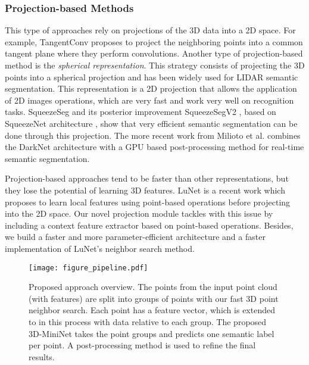 \documentclass[letterpaper, 10 pt, journal, twoside]{IEEEtran}
\begin{document}
\subsubsection{Projection-based Methods}
This type of approaches rely on projections of the 3D data into a 2D space.
For example, TangentConv\cite{tangentconv} proposes to project the neighboring points into a common tangent plane where they perform convolutions.
Another type of projection-based method is the \textit{spherical representation}. This strategy consists of projecting the 3D points into a spherical projection and has been widely used for LIDAR semantic segmentation. This representation is a 2D projection that allows the application of 2D images operations, which are very fast and work very well on recognition tasks. SqueezeSeg \cite{wu2018squeezeseg} and its posterior improvement SqueezeSegV2 \cite{wu2019squeezesegv2}, based on SqueezeNet architecture \cite{iandola2016squeezenet}, show that very efficient semantic segmentation can be done through this projection. The more recent work from Milioto et al. \cite{milioto2019rangenet++} combines the DarkNet architecture \cite{redmon2018yolov3} with a GPU based post-processing method for real-time semantic segmentation. 

Projection-based approaches tend to be faster than other representations, but they lose the potential of learning 3D features.
LuNet \cite{biasutti2019lu} is a recent work which proposes to learn local features using point-based operations before projecting into the 2D space.  
 Our novel projection module tackles with this issue by including a context feature extractor based on point-based operations. Besides, we build a faster and more parameter-efficient architecture and a faster implementation of LuNet's neighbor search method. 
  




\begin{figure}[!tb]
\centering
\texttt{[image: figure\_pipeline.pdf]}
\caption{Proposed approach overview. 
The  points from the input point cloud (with   features) are split into  groups of  points with our fast 3D point neighbor search. Each point has a  feature vector, which is extended to  in this process with data relative to each group.
The proposed 3D-MiniNet takes the point groups and predicts one semantic label per point. 
A post-processing method  \cite{milioto2019rangenet++} is used to refine the final results.}
\label{fig:pipeline}
\end{figure} 
\end{document}

